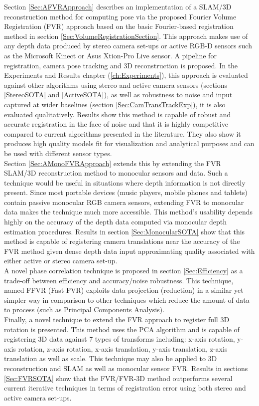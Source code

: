 Section \ref{Sec:AFVRApproach} describes an implementation of a SLAM/3D reconstruction method for computing pose via the proposed Fourier Volume Registration (FVR) approach based on the basic Fourier-based registration method in section \ref{Sec:VolumeRegistrationSection}. This approach makes use of any depth data produced by stereo camera set-ups or active RGB-D sensors such as the Microsoft Kinect or Asus Xtion-Pro Live sensor. A pipeline for registration, camera pose tracking and 3D reconstruction is proposed. In the Experiments and Results chapter (\ref{ch:Experiments}), this approach is evaluated against other algorithms using stereo and active camera sensors (sections \ref{StereoSOTA} and \ref{ActiveSOTA}), as well as robustness to noise and input captured at wider baselines (section \ref{Sec:CamTransTrackExp}), it is also evaluated qualitatively. Results show this method is capable of robust and accurate registration in the face of noise and that it is highly competitive compared to current algorithms presented in the literature. They also show it produces high quality models fit for visualization and analytical purposes and can be used with different sensor types.  \\

Section \ref{Sec:AMonoFVRApproach} extends this by extending the FVR SLAM/3D reconstruction method to monocular sensors and data. Such a technique would be useful in situations where depth information is not directly present. Since most portable devices (music players, mobile phones and tablets) contain passive monocular RGB camera sensors, extending FVR to monocular data makes the technique much more accessible. This method's usability depends highly on the accuracy of the depth data computed via monocular depth estimation procedures. Results in section \ref{Sec:MonocularSOTA} show that this method is capable of registering camera translations near the accuracy of the FVR method given dense depth data input approximating quality associated with either active or stereo camera set-up.  \\

A novel phase correlation technique is proposed in section \ref{Sec:Efficiency} as a trade-off between efficiency and accuracy/noise robustness. This technique, named FFVR (Fast FVR) exploits data projection (reduction) in a similar yet simpler way in comparison to other techniques which reduce the amount of data to process (such as Principal Components Analysis). \\

Finally, a novel technique to extend the FVR approach to register full 3D rotation is presented. This method uses the PCA algorithm and is capable of registering 3D data against 7 types of transforms including: x-axis rotation, y-axis rotation, z-axis rotation, x-axis translation, y-axis translation, z-axis translation as well as scale. This technique may also be applied to 3D reconstruction and SLAM as well as monocular sensor FVR. Results in sections \ref{Sec:FVRSOTA} show that the FVR/FVR-3D method outperforms several current iterative techniques in terms of registration error using both stereo and active camera set-ups.  \\